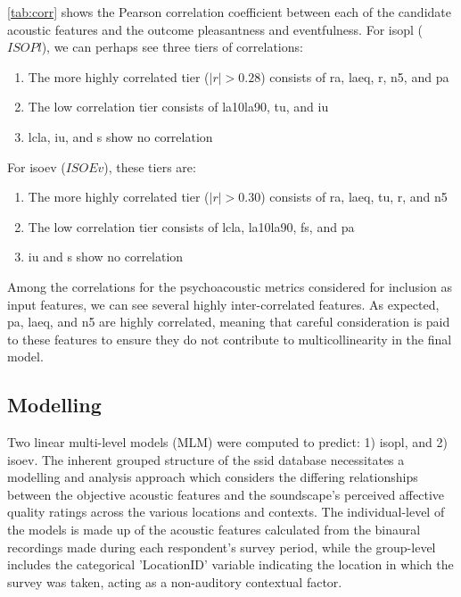   \cref{tab:corr} shows the Pearson correlation coefficient between each of the candidate acoustic features and the outcome pleasantness and eventfulness. For \gls{isopl} ($ISOPl$), we can perhaps see three tiers of correlations:

   \begin{enumerate}
     \item The more highly correlated tier ($|r| > 0.28$) consists of \gls{ra}, \gls{laeq}, \gls{r}, \gls{n5}, and \gls{pa}
     \item The low correlation tier consists of \gls{la10la90}, \gls{tu}, and \gls{iu}
     \item \gls{lcla}, \gls{iu}, and \gls{s} show no correlation
   \end{enumerate}

   For \gls{isoev} ($ISOEv$), these tiers are:
   \begin{enumerate}
     \item The more highly correlated tier ($|r| > 0.30$) consists of \gls{ra}, \gls{laeq}, \gls{tu}, \gls{r}, and \gls{n5}
     \item The low correlation tier consists of \gls{lcla}, \gls{la10la90}, \gls{fs}, and \gls{pa}
     \item \gls{iu} and \gls{s} show no correlation
   \end{enumerate}

   Among the correlations for the psychoacoustic metrics considered for inclusion as input features, we can see several highly inter-correlated features. As expected, \gls{pa}, \gls{laeq}, and \gls{n5} are highly correlated, meaning that careful consideration is paid to these features to ensure they do not contribute to multicollinearity in the final model.

 \subsection{Modelling}

   Two linear multi-level models (MLM) were computed to predict: 1) \gls{isopl}, and 2) \gls{isoev}. The inherent grouped structure of the \gls{ssid} database necessitates a modelling and analysis approach which considers the differing relationships between the objective acoustic features and the soundscape's perceived affective quality ratings across the various locations and contexts. The individual-level of the models is made up of the acoustic features calculated from the binaural recordings made during each respondent's survey period, while the group-level includes the categorical 'LocationID' variable indicating the location in which the survey was taken, acting as a non-auditory contextual factor.

